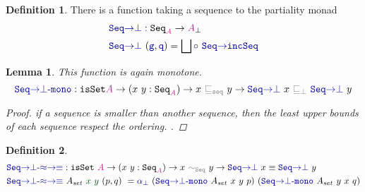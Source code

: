 \documentclass[twoside,11pt,openright]{report}
\theoremstyle{plain} %
\newtheorem{lem}[thm]{Lemma}
\theoremstyle{definition}
\newtheorem{defn}{Definition}[section]
\theoremstyle{remark}
\newcommand*{\term}[1]{\textcolor{green!30!black}{#1}} %
\newcommand*{\type}[1]{\textcolor{magenta!90!black}{#1}}
\newcommand*{\relation}[1]{\textcolor{gray}{\ensuremath{\mathtt{#1}}}}
\newcommand*{\function}[1]{\textcolor{blue!60!black}{\ensuremath{\mathtt{#1}}}}
\newcommand*{\typeformer}[1]{\ensuremath{\mathtt{#1}}}
\begin{document}
\begin{defn}
  There is a function taking a sequence to the partiality monad
  \begin{equation}
    \begin{aligned}
      &\function{Seq{\rightarrow}\bot} : \typeformer{Seq}_{\type{A}} \rightarrow \type{A}_{\bot} \\
      &\function{Seq{\rightarrow}\bot}~(\function{g},\function{q}) = \bigsqcup \circ~\function{Seq{\rightarrow}incSeq}
    \end{aligned}
  \end{equation}
\end{defn}
\begin{lem}
  This function is again monotone.
  \begin{equation}
    \function{Seq{\rightarrow}\bot\text{-}mono} : \typeformer{isSet} \type{A} \rightarrow (x~y : \typeformer{Seq}_{\type{A}}) \rightarrow x~\relation{\sqsubseteq_{seq}}~y \rightarrow \function{Seq{\rightarrow}\bot}~x~\relation{\sqsubseteq_{\bot}}~\function{Seq{\rightarrow}\bot}~y
\end{equation}
  \begin{proof}
    if a sequence is smaller than another sequence, then the least upper bounds of each sequence respect the ordering. .
  \end{proof}
\end{lem}
\begin{defn}
\begin{equation}
  \begin{aligned}
    &\function{Seq{\rightarrow}\bot\text{-}{\approx}{\rightarrow}{\equiv}} : \typeformer{isSet}~\type{A} \rightarrow (x~y : \typeformer{Seq}_{\type{A}}) \rightarrow x~\relation{\sim_{Seq}}~y \rightarrow \function{Seq{\rightarrow}\bot}~x \equiv \function{Seq{\rightarrow}\bot}~y \\
    &\function{Seq{\rightarrow}\bot\text{-}{\approx}{\rightarrow}{\equiv}}~A_{set}~\term{x}~\term{y}~(p , q)~= \function{\alpha_{\bot}}~(\function{Seq{\rightarrow}\bot\text{-}mono}~A_{set}~x~y~p)~(\function{Seq{\rightarrow}\bot\text{-}mono}~A_{set}~y~x~q)
  \end{aligned}
\end{equation}
\end{defn}
\end{document}
